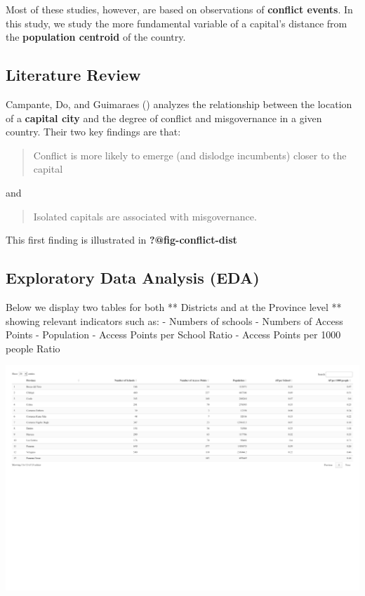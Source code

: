 \documentclass[
  letterpaper,
  DIV=11,
  numbers=noendperiod]{scrartcl}
\begin{document}
Most of these studies, however, are based on observations of
\textbf{conflict events}. In this study, we study the more fundamental
variable of a capital's distance from the \textbf{population centroid}
of the country.

\subsection{Literature Review}\label{literature-review}

Campante, Do, and Guimaraes ()
analyzes the relationship between the location of a \textbf{capital
city} and the degree of conflict and misgovernance in a given country.
Their two key findings are that:

\begin{quote}
Conflict is more likely to emerge (and dislodge incumbents) closer to
the capital
\end{quote}

and

\begin{quote}
Isolated capitals are associated with misgovernance.
\end{quote}

This first finding is illustrated in \textbf{?@fig-conflict-dist}

\subsection{Exploratory Data Analysis
(EDA)}\label{exploratory-data-analysis-eda}

Below we display two tables for both ** Districts and at the Province
level ** showing relevant indicators such as: - Numbers of schools -
Numbers of Access Points - Population - Access Points per School Ratio -
Access Points per 1000 people Ratio

\includegraphics{index_files/figure-pdf/exploratoy-data-analysis-1.pdf}
\end{document}
